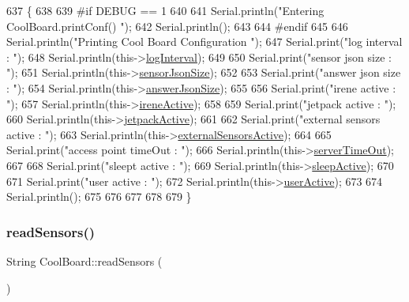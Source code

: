 \begin{DoxyCode}
637 \{
638 
639 \textcolor{preprocessor}{#if DEBUG == 1}
640     
641     Serial.println(\textcolor{stringliteral}{"Entering CoolBoard.printConf() "});
642     Serial.println();
643 
644 \textcolor{preprocessor}{#endif}
645 
646     Serial.println(\textcolor{stringliteral}{"Printing Cool Board Configuration "});
647     Serial.print(\textcolor{stringliteral}{"log interval      : "});
648     Serial.println(this->\hyperlink{classCoolBoard_a4de0096d575d66b472c4c1f0111fd452}{logInterval});
649 
650     Serial.print(\textcolor{stringliteral}{"sensor json size      : "});
651     Serial.println(this->\hyperlink{classCoolBoard_a58e4b6072e3ac8b141ec0befb479208e}{sensorJsonSize});
652 
653     Serial.print(\textcolor{stringliteral}{"answer json size      : "});
654     Serial.println(this->\hyperlink{classCoolBoard_af2da1f85315b3d074a8b87d158094fb7}{answerJsonSize});
655 
656     Serial.print(\textcolor{stringliteral}{"irene active      : "});
657     Serial.println(this->\hyperlink{classCoolBoard_a9c3f7ac625481ee2ae802a25d97a4ae0}{ireneActive});
658 
659     Serial.print(\textcolor{stringliteral}{"jetpack active        : "});
660     Serial.println(this->\hyperlink{classCoolBoard_a9be03a913d26e558328935ca3b59a75e}{jetpackActive});
661 
662     Serial.print(\textcolor{stringliteral}{"external sensors active   : "});
663     Serial.println(this->\hyperlink{classCoolBoard_a638b00b76aeb819ecfd4c10b8cdd7bb7}{externalSensorsActive});
664 
665     Serial.print(\textcolor{stringliteral}{"access point timeOut  : "});
666     Serial.println(this->\hyperlink{classCoolBoard_a7a8d8d3d316220cdd049cd63c1aa8fe6}{serverTimeOut});
667 
668     Serial.print(\textcolor{stringliteral}{"sleept active         : "});
669     Serial.println(this->\hyperlink{classCoolBoard_a0a51b2287139f66c738101fb53139230}{sleepActive});
670 
671     Serial.print(\textcolor{stringliteral}{"user active       : "});
672     Serial.println(this->\hyperlink{classCoolBoard_a6395459131d6889a3005f79c7a35e964}{userActive});
673 
674     Serial.println();
675 
676 
677 
678 
679 \}
\end{DoxyCode}
\mbox{\label{classCoolBoard_ad03abdce2e65f520bbf2cff0f2d083cf}} 
\subsubsection{\texorpdfstring{read\+Sensors()}{readSensors()}}
{\footnotesize\ttfamily String Cool\+Board\+::read\+Sensors (\begin{DoxyParamCaption}{ }\end{DoxyParamCaption})}

